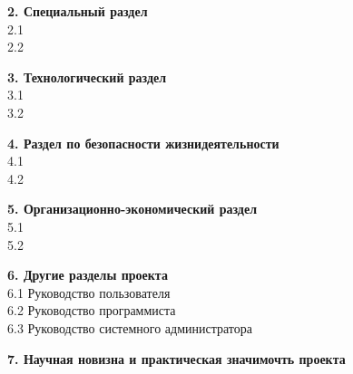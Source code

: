 \begin{titlepage}
\begin{flushleft}
\textbf{2. Специальный раздел}
\fontsize{8pt}{8.05pt}{\selectfont{(раскрываются все аспекты проектируемой области)} } \\
2.1\hrulefill \\
2.2\hrulefill \\
\end{flushleft}

\begin{flushleft}
\textbf{3. Технологический раздел}
\fontsize{8pt}{8.05pt}{\selectfont{(технология разработки программного, программно-аппартного, информационного
или технологического продукта)} } \\
3.1\hrulefill \\
3.2\hrulefill \\
\end{flushleft}

\begin{flushleft}
\textbf{4. Раздел по безопасности жизнидеятельности} \\
4.1\hrulefill \\
4.2\hrulefill \\
\end{flushleft}

\begin{flushleft}
\textbf{5. Организационно-экономический раздел} \\
5.1\hrulefill \\
5.2\hrulefill \\
\end{flushleft}

\begin{flushleft}
\textbf{6. Другие разделы проекта}
\fontsize{8pt}{8.05pt}{\selectfont{(Конструкторский, методический, и т.п., в т.ч. сопровождение разработанного в дипломном
проекте программного (математического, аппаратного или иного) обеспечения)} } \\
6.1 Руководство пользователя \\
6.2 Руководство программиста \\
6.3 Руководство системного администратора \\
\end{flushleft}

\begin{flushleft}
\textbf{7. Научная новизна и практическая значимочть проекта}\hrulefill \\
\hrulefill \\
\hrulefill \\
\end{flushleft}


\end{titlepage}
